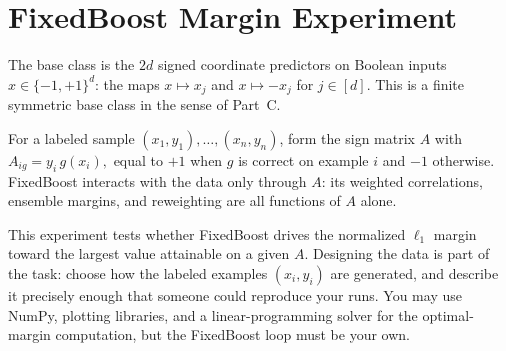 \documentclass[11pt]{article}
\begin{document}
\section{FixedBoost Margin Experiment}
The base class is the $2d$ signed coordinate predictors on Boolean inputs 
$x \in \{-1,+1\}^d$: the maps $x \mapsto x_j$ and $x \mapsto -x_j$ for $j \in [d]$. 
This is a finite symmetric base class in the sense of Part~C. 

For a labeled sample $(x_1,y_1),\ldots,(x_n,y_n)$, form the sign matrix $A$ with 
$
A_{i g} = y_i\, g(x_i),
$
equal to $+1$ when $g$ is correct on example $i$ and $-1$ otherwise.  
FixedBoost interacts with the data only through $A$: its weighted correlations, ensemble 
margins, and reweighting are all functions of $A$ alone.

This experiment tests whether FixedBoost drives the normalized $\ell_1$ margin toward the 
largest value attainable on a given $A$. Designing the data is part of the task: choose how 
the labeled examples $(x_i,y_i)$ are generated, and describe it precisely enough that someone 
could reproduce your runs. You may use NumPy, plotting libraries, and a linear-programming 
solver for the optimal-margin computation, but the FixedBoost loop must be your own.
\end{document}
